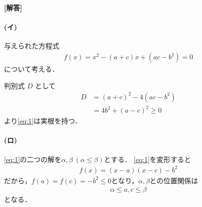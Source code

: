\documentclass[../../main.tex]{subfiles}
\begin{document}
\begin{oframed}
  
\end{oframed}

{\bf [解答]}

\paragraph{(イ)}

与えられた方程式
\begin{align}
  f(x) = x^2-(a+c)x+(ac-b^2)=0 \label{eq:1}
\end{align}
について考える．

判別式 $D$ として
\begin{align}
  D
  &= (a+c)^2 - 4(ac-b^2) \\
  &= 4b^2 + (a-c)^2 \ge 0
\end{align}
より\cref{eq:1}は実根を持つ．

\paragraph{(ロ)}

\cref{eq:1}の二つの解を$\alpha,\beta \ (\alpha\le\beta)$とする．
\cref{eq:1}を変形すると
\begin{align}
  f(x) = (x-a)(x-c) - b^2 \label{eq:2}
\end{align}
だから，$f(a)=f(c)=-b^2\le 0$となり，$\alpha,\beta$との位置関係は
\begin{align}
  \alpha \le a,c \le \beta \label{eq:3}
\end{align}
となる．
\end{document}
